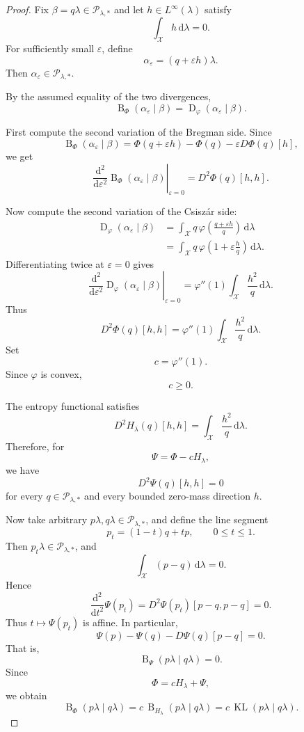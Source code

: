 \documentclass[11pt]{article}
\newcommand{\X}{\mathcal X}
\newcommand{\Pcal}{\mathcal P}
\newcommand{\KL}{\operatorname{KL}}
\newcommand{\Breg}{\operatorname{B}}
\newcommand{\Dphi}{\operatorname{D}}
\newcommand{\dd}{\mathrm d}
\newcommand{\1}{\mathbf 1}
\begin{document}
\begin{proof}
Fix \(\beta=q\lambda\in\Pcal_{\lambda,*}\) and let
\(h\in L^\infty(\lambda)\) satisfy
\[
\int_\X h\,\dd\lambda=0.
\]
For sufficiently small \(\varepsilon\), define
\[
\alpha_\varepsilon=(q+\varepsilon h)\lambda.
\]
Then \(\alpha_\varepsilon\in\Pcal_{\lambda,*}\).

By the assumed equality of the two divergences,
\[
\Breg_\Phi(\alpha_\varepsilon\mid\beta)
=
\Dphi_\varphi(\alpha_\varepsilon\mid\beta).
\]

First compute the second variation of the Bregman side. Since
\[
\Breg_\Phi(\alpha_\varepsilon\mid\beta)
=
\Phi(q+\varepsilon h)-\Phi(q)-\varepsilon D\Phi(q)[h],
\]
we get
\[
\left.
\frac{\dd^2}{\dd\varepsilon^2}
\Breg_\Phi(\alpha_\varepsilon\mid\beta)
\right|_{\varepsilon=0}
=
D^2\Phi(q)[h,h].
\]

Now compute the second variation of the Csisz\'ar side:
\begin{align*}
\Dphi_\varphi(\alpha_\varepsilon\mid\beta)
&=
\int_\X
q\,
\varphi\!\left(
\frac{q+\varepsilon h}{q}
\right)
\,\dd\lambda \\
&=
\int_\X
q\,
\varphi\!\left(
1+\varepsilon\frac{h}{q}
\right)
\,\dd\lambda.
\end{align*}
Differentiating twice at \(\varepsilon=0\) gives
\[
\left.
\frac{\dd^2}{\dd\varepsilon^2}
\Dphi_\varphi(\alpha_\varepsilon\mid\beta)
\right|_{\varepsilon=0}
=
\varphi''(1)
\int_\X
\frac{h^2}{q}
\,\dd\lambda.
\]
Thus
\[
D^2\Phi(q)[h,h]
=
\varphi''(1)
\int_\X
\frac{h^2}{q}
\,\dd\lambda.
\]
Set
\[
c=\varphi''(1).
\]
Since \(\varphi\) is convex,
\[
c\geq 0.
\]

The entropy functional satisfies
\[
D^2H_\lambda(q)[h,h]
=
\int_\X \frac{h^2}{q}\,\dd\lambda.
\]
Therefore, for
\[
\Psi=\Phi-cH_\lambda,
\]
we have
\[
D^2\Psi(q)[h,h]=0
\]
for every \(q\in\Pcal_{\lambda,*}\) and every bounded zero-mass direction \(h\).

Now take arbitrary \(p\lambda,q\lambda\in\Pcal_{\lambda,*}\), and define the
line segment
\[
p_t=(1-t)q+tp,
\qquad
0\leq t\leq 1.
\]
Then \(p_t\lambda\in\Pcal_{\lambda,*}\), and
\[
\int_\X (p-q)\,\dd\lambda=0.
\]
Hence
\[
\frac{\dd^2}{\dd t^2}\Psi(p_t)
=
D^2\Psi(p_t)[p-q,p-q]
=
0.
\]
Thus \(t\mapsto \Psi(p_t)\) is affine. In particular,
\[
\Psi(p)-\Psi(q)-D\Psi(q)[p-q]=0.
\]
That is,
\[
\Breg_\Psi(p\lambda\mid q\lambda)=0.
\]
Since
\[
\Phi=cH_\lambda+\Psi,
\]
we obtain
\[
\Breg_\Phi(p\lambda\mid q\lambda)
=
c\,\Breg_{H_\lambda}(p\lambda\mid q\lambda)
=
c\,\KL(p\lambda\mid q\lambda).
\]


\end{proof}
\end{document}
